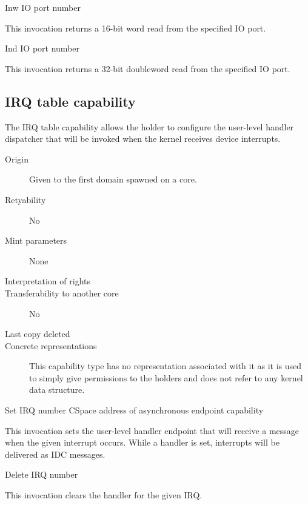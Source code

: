 \begin{invocation}{Inw}
  \arg IO port number
\end{invocation}
This invocation returns a 16-bit word read from the specified IO port.

\begin{invocation}{Ind}
  \arg IO port number
\end{invocation}
This invocation returns a 32-bit doubleword read from the specified IO port.

\subsection{IRQ table capability}
The IRQ table capability allows the holder to configure the user-level
handler dispatcher that will be invoked when the kernel receives
device interrupts.


\begin{description}
\item[Origin] Given to the first domain spawned on a core.
  
\item[Retyability] No
  
\item[Mint parameters] None
  
\item[Interpretation of rights] 
  
\item[Transferability to another core] No

\item[Last copy deleted] 
  
\item[Concrete representations] This capability type has no
  representation associated with it as it is used to simply give
  permissions to the holders and does not refer to any kernel data
  structure.
  \end{description}

\begin{invocation}{Set}
  \arg IRQ number
  \arg CSpace address of asynchronous endpoint capability
\end{invocation}
This invocation sets the user-level handler endpoint that will receive
a message when the given interrupt occurs.  While a handler is set,
interrupts will be delivered as IDC messages.


\begin{invocation}{Delete}
  \arg IRQ number
\end{invocation}
This invocation clears the handler for the given IRQ.

